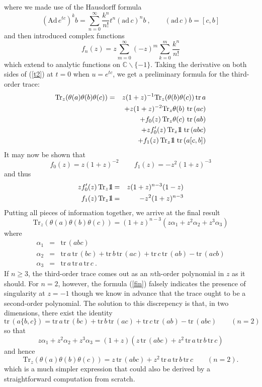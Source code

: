 \documentclass[11pt,a4paper]{article}
\newcommand{\CC}{\mathbb{C}}
\def\one{{\mathchoice {\rm 1\mskip-4mu l} {\rm 1\mskip-4mu l}
        {\rm 1\mskip-4.5mu l} {\rm 1\mskip-5mu l}}}
\newcommand{\ah}{\theta(a)}
\newcommand{\bh}{\theta(b)}
\newcommand{\ch}{\theta(c)}
\newcommand{\tr}{\mbox{tr}\,}
\newcommand{\Tz}{\mbox{Tr}_z}
\begin{document}
where we made use of the Hausdorff formula
$$
 (\mbox{Ad}\,e^{tc})^kb=\sum_{n=0}^\infty \frac{k^n}{n!}t^n(\mbox{ad}\,c)^nb\ ,\qquad  (\mbox{ad}\,c)b=[c,b]
$$
and then introduced complex functions
$$
     f_n(z)=z\sum_{m=0}^\infty(-z)^m \sum_{k=0}^m\frac{k^n}{n!}
$$
which extend to analytic functions on $\CC\backslash\{-1\}$. Taking the 
derivative on both sides of (\ref{t2}) at $t=0$ when $u=e^{tc}$, we get a 
preliminary formula for the third-order trace:
\begin{eqnarray*}
  \Tz (\ah\bh\ch) &=&z(1+z)^{-1}\Tz (\bh\ch)\,\tr a   \\
                   & &+z(1+z)^{-2}\Tz \bh\ \tr(ac)        \\
                   & &+f_0(z)\,\Tz \ch\ \tr(ab)        \\
                   & &+zf'_0(z)\,\Tz \one\ \tr(abc)    \\
                   & &+f_1(z)\,\Tz \one\ \tr(a[c,b])
\end{eqnarray*}
It may now be shown that
$$
   f_0(z)=z(1+z)^{-2}\,\qquad f_1(z)=-z^2(1+z)^{-3}
$$
and thus 
\begin{eqnarray*}
  zf'_0(z)\,\Tz \one &=&z(1+z)^{n-3}(1-z)\\
    f_1(z)\,\Tz \one &=&-z^2(1+z)^{n-3}
\end{eqnarray*}
Putting all pieces of information together, we arrive at the final result
\begin{equation}
  \Tz (\ah\bh\ch)=(1+z)^{n-3}(z\alpha_1+z^2\alpha_2+z^3\alpha_3) \label{fin}
\end{equation}
where
\begin{eqnarray}
 \alpha_1 &=&\tr(abc)   \label{o1}\\
 \alpha_2 &=&\tr a\,\tr(bc)+\tr b\,\tr(ac)+\tr c\,\tr(ab)-\tr(acb)\label{o2}\\
 \alpha_3 &=&\tr a\,\tr a\,\tr c\ . 
\end{eqnarray}
If $n\ge 3$, the third-order trace comes out as an $n$th-order polynomial 
in $z$ as it should. For $n=2$, however, the formula (\ref{fin}) falsely
indicates the presence of singularity at $z=-1$ though we know in advance
that the trace ought to be a second-order polynomial. 
The solution to this discrepency is that, in two dimensions, there exist 
the identity
$$
   \tr(a\{b,c\})=\tr a\,\tr(bc)+\tr b\,\tr(ac)+\tr c\,\tr(ab)-\tr(abc)
   \qquad(n=2)
$$
so that
$$
 z\alpha_1+z^2\alpha_2+z^3\alpha_3=(1+z)(z\,\tr(abc)+z^2\,\tr a\,\tr b\,\tr c)
$$
and hence
\begin{equation}
  \label{ntwo}
       \Tz (\ah\bh\ch)=z\,\tr(abc)+z^2\,\tr a\,\tr b\,\tr c \qquad (n=2).   
\end{equation}
which is a much simpler expression that could also be derived by a
straightforward computation from scratch.
\end{document}
